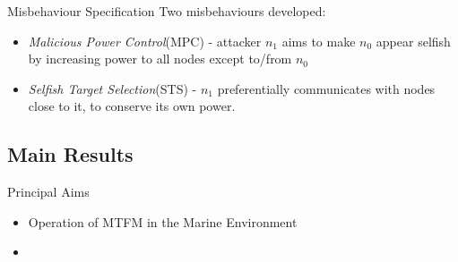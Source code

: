 \documentclass{beamer}
\begin{document}
\begin{frame}{Misbehaviour Specification}
  Two misbehaviours developed:
  \begin{itemize}
    \item \emph{Malicious Power Control}(MPC) - attacker $n_1$ aims to make $n_0$ appear selfish by increasing power to all nodes except to/from $n_0$
    \item \emph{Selfish Target Selection}(STS) - $n_1$ preferentially communicates with nodes close to it, to conserve its own power.
  \end{itemize}

\end{frame}

\subsection{Main Results}

\begin{frame}{Principal Aims}
\begin{itemize}
  \item Operation of MTFM in the Marine Environment
  \item 
\end{itemize}
\end{frame}
\end{document}

